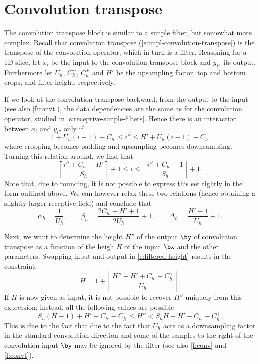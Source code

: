 \section{Convolution transpose}\label{s:receptive-convolution-transpose}

The convolution transpose block is similar to a simple filter, but somewhat more complex. Recall that convolution transpose (\autoref{s:impl-convolution-transpose}) is the transpose of the convolution operator, which in turn is a filter. Reasoning for a 1D slice, let $x_i$ be the input to the convolution transpose block and $y_{i''}$ its output. Furthermore let $U_h$, $C_h^-$, $C_h^+$ and $H'$ be the upsampling factor, top and bottom crops, and filter height, respectively.

If we look at the convolution transpose backward, from the output to the input (see also \autoref{f:convt}), the data dependencies are the same as for the convolution operator, studied in \autoref{s:receptive-simple-filters}. Hence there is an interaction between $x_i$ and $y_{i''}$ only if
\begin{equation}\label{e:convt-bounds}
   1 + U_h(i - 1) - C_h^- \leq i'' \leq H' + U_h(i - 1) - C_h^-
\end{equation}
where cropping becomes padding and upsampling becomes downsampling. Turning this relation around, we find that
\[
 \left\lceil \frac{i'' + C_h^- -H'}{S_h} \right\rceil + 1
 \leq
 i
 \leq
 \left\lfloor \frac{i'' + C_h^- - 1}{S_h} \right\rfloor + 1 .
\]
Note that, due to rounding, it is not possible to express this set tightly in the form outlined above. We can however relax these two relations (hence obtaining a slightly larger receptive field) and conclude that
\[
\alpha_h = \frac{1}{U_h},
\qquad
\beta_h = \frac{2C_h^- - H' + 1}{2 U_h} + 1,
\qquad
\Delta_h = \frac{H' -1}{U_h} + 1.
\]

Next, we want to determine the height $H''$ of the output $\by$ of convolution transpose as a function of the heigh $H$ of the input $\bx$ and the other parameters. Swapping input and output in  \autoref{e:filtered-height} results in the constraint:
\[
H = 1+ \left\lfloor \frac{H'' - H' + C_h^- + C_h^+}{U_h} \right\rfloor.
\]
If $H$ is now given as input, it is not possible to recover $H''$ uniquely from this expression; instead, all the following values are possible
\[
   S_h (H-1) +H' -  C_h^- - C_h^+ \leq H'' < S_h H +H' -  C_h^- - C_h^+.
\]
This is due to the fact that due to the fact that $U_h$ acts as a downsampling factor in the standard convolution direction and some of the samples to the right of the convolution input $\by$ may be ignored by the filter (see also \autoref{f:conv} and \autoref{f:convt}).

